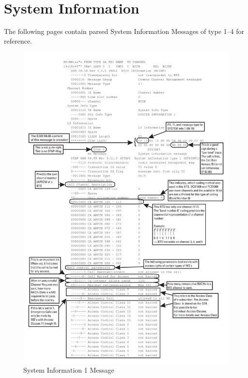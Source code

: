 \chapter{System Information}
\label{sec:system_infos}
The following pages contain parsed System Information Messages of type 1--4  for reference.
\begin{figure}
\centering
\includegraphics[width=.9\textwidth]{../Images/sysinfo1}
\caption{System Information 1 Message}
\end{figure}
